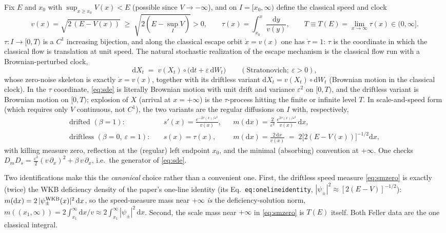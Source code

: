 \documentclass[11pt]{article}
\theoremstyle{remark}
\newcommand{\dd}{\mathrm{d}}
\begin{document}
Fix $E$ and $x_{0}$ with $\sup_{x\ge x_{0}}V(x)<E$ (possible since
$V\to-\infty$), and on $I=[x_{0},\infty)$ define the classical speed and
clock
\[
v(x)=\sqrt{2\,(E-V(x))}\;\ge\;\sqrt{2(E-\textstyle\sup_{I}V)}>0,
\qquad
\tau(x)=\int_{x_{0}}^{x}\frac{\dd y}{v(y)},
\qquad
T\equiv T(E)=\lim_{x\to\infty}\tau(x)\in(0,\infty].
\]
$\tau:I\to[0,T)$ is a $C^{1}$ increasing bijection, and along the
classical escape orbit $\dot x=v(x)$ one has $\dot\tau=1$: $\tau$ is
the coordinate in which the classical flow is translation at unit
speed.  The natural stochastic realization of the escape mechanism is
the classical flow run with a Brownian-perturbed clock,
\begin{equation}
\dd X_{t}\;=\;v(X_{t})\circ\bigl(\dd t+\varepsilon\,\dd W_{t}\bigr)
\qquad(\text{Stratonovich};\ \varepsilon>0),
\label{eq:sde}
\end{equation}
whose zero-noise skeleton is exactly $\dot x=v(x)$, together with its
driftless variant $\dd X_{t}=v(X_{t})\circ \dd W_{t}$ (Brownian motion
in the classical clock).  In the $\tau$ coordinate, \eqref{eq:sde} is
literally Brownian motion with unit drift and variance
$\varepsilon^{2}$ on $[0,T)$, and the driftless variant is Brownian
motion on $[0,T)$; explosion of $X$ (arrival at $x=+\infty$) is the
$\tau$-process hitting the finite or infinite level $T$.  In
scale-and-speed form (which requires only $V$ continuous, not $C^{1}$),
the two variants are the regular diffusions on $I$ with, respectively,
\begin{align}
\text{drifted } (\beta=1):\quad
&s'(x)=\frac{e^{-2\tau(x)/\varepsilon^{2}}}{v(x)},
&&m(\dd x)=\frac{2}{\varepsilon^{2}}\,
   \frac{e^{2\tau(x)/\varepsilon^{2}}}{v(x)}\,\dd x,
\label{eq:smdrift}\\
\text{driftless } (\beta=0,\ \varepsilon=1):\quad
&s(x)=\tau(x),
&&m(\dd x)=\frac{2\,\dd x}{v(x)}
   \;=\;2\bigl[2(E-V(x))\bigr]^{-1/2}\dd x,
\label{eq:smzero}
\end{align}
with killing measure zero, reflection at the (regular) left endpoint
$x_{0}$, and the minimal (absorbing) convention at $+\infty$.  One
checks $D_{m}D_{s}=\tfrac{\varepsilon^{2}}{2}(v\,\partial_{x})^{2}
+\beta\,v\,\partial_{x}$, i.e.\ the generator of \eqref{eq:sde}.

Two identifications make this the \emph{canonical} choice rather than a
convenient one.  First, the driftless speed measure \eqref{eq:smzero}
is exactly (twice) the WKB deficiency density of the paper's one-line
identity (its Eq.~\texttt{eq:onelineidentity},
$|\psi_{\pm}|^{2}\approx[2(E-V)]^{-1/2}$):
$m(\dd x)=2\,|\psi_{\pm}^{\rm WKB}(x)|^{2}\,\dd x$, so the
speed-measure mass near $+\infty$ \emph{is} the deficiency-solution
norm, $m((x_{1},\infty))=2\int_{x_{1}}^{\infty}\dd x/v\approx
2\int_{x_{1}}^{\infty}|\psi_{\pm}|^{2}\,\dd x$.  Second, the scale mass
near $+\infty$ in \eqref{eq:smzero} is $T(E)$ itself.  Both Feller data
are the one classical integral.
\end{document}
